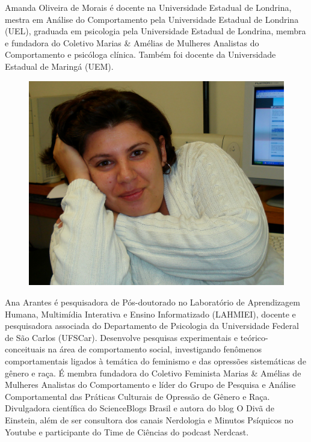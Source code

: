 \noindent Amanda Oliveira de Morais é docente na Universidade Estadual de Londrina, mestra em Análise do Comportamento pela Universidade Estadual de Londrina (UEL), graduada em psicologia pela Universidade Estadual de Londrina, membra e fundadora do Coletivo Marias \& Amélias de Mulheres Analistas do Comportamento e psicóloga clínica. Também foi docente da Universidade Estadual de Maringá (UEM).\\
\linebreak
\linebreak
\begin{figure}
    \centering
    \includegraphics[width=0.2\paperwidth]{autoras/anaarantes.jpg}
\end{figure}

\noindent Ana Arantes é pesquisadora de Pós-doutorado no Laboratório de Aprendizagem Humana, Multimídia Interativa e Ensino Informatizado (LAHMIEI), docente e pesquisadora associada do Departamento de Psicologia da Universidade Federal de São Carlos (UFSCar). Desenvolve pesquisas experimentais e teórico-conceituais na área de comportamento social, investigando fenômenos comportamentais ligados à temática do feminismo e das opressões sistemáticas de gênero e raça. É membra fundadora do Coletivo Feminista Marias \& Amélias de Mulheres Analistas do Comportamento e líder do Grupo de Pesquisa e Análise Comportamental das Práticas Culturais de Opressão de Gênero e Raça. Divulgadora científica do ScienceBlogs Brasil e autora do blog O Divã de Einstein, além de ser consultora dos canais Nerdologia e Minutos Psíquicos no Youtube e participante do Time de Ciências do podcast Nerdcast.